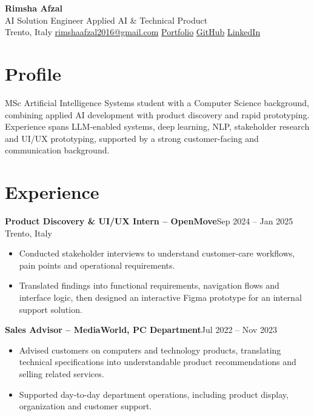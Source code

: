 \documentclass[10pt,a4paper]{article}
\newcommand{\role}[2]{\textbf{#1}{\color{textgray}\space\textbar{}\space#2}}
\newcommand{\place}[1]{{\color{textgray}#1}}
\begin{document}
\begin{center}
  {\LARGE\bfseries Rimsha Afzal}\\[-1pt]
  {\large AI Solution Engineer \textbar{} Applied AI \& Technical Product}\\[3pt]
  Trento, Italy \textbar{}
  \href{mailto:rimshaafzal2016@gmail.com}{rimshaafzal2016@gmail.com} \textbar{}
  \href{https://rimsha-afzal.github.io/}{Portfolio} \textbar{}
  \href{https://github.com/rimsha-afzal}{GitHub} \textbar{}
  \href{https://www.linkedin.com/in/rimsha-afzal-b0537123b/}{LinkedIn}
\end{center}

\section*{Profile}
MSc Artificial Intelligence Systems student with a Computer Science background, combining applied AI development with product discovery and rapid prototyping. Experience spans LLM-enabled systems, deep learning, NLP, stakeholder research and UI/UX prototyping, supported by a strong customer-facing and communication background.

\section*{Experience}
\role{Product Discovery \& UI/UX Intern -- OpenMove}{Sep 2024 -- Jan 2025}\\
\place{Trento, Italy}
\begin{itemize}
  \item Conducted stakeholder interviews to understand customer-care workflows, pain points and operational requirements.
  \item Translated findings into functional requirements, navigation flows and interface logic, then designed an interactive Figma prototype for an internal support solution.
\end{itemize}

\role{Sales Advisor -- MediaWorld, PC Department}{Jul 2022 -- Nov 2023}
\begin{itemize}
  \item Advised customers on computers and technology products, translating technical specifications into understandable product recommendations and selling related services.
  \item Supported day-to-day department operations, including product display, organization and customer support.
\end{itemize}
\end{document}
